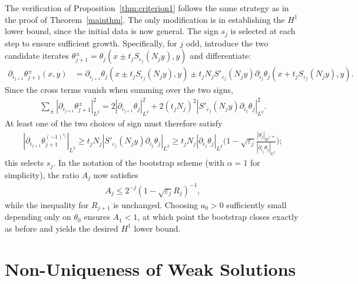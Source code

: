 \documentclass[12pt]{report}   %
\renewcommand{\le}{\leqslant}
\renewcommand{\ge}{\geqslant}
\numberwithin{equation}{section}
\theoremstyle{plain}
\theoremstyle{definition}
\theoremstyle{remark}
\newcommand{\eps}{{\varepsilon}}
\newcommand{\rd}{\partial}
\begin{document}
The verification of Proposition~\ref{thm:criterion1} follows the same strategy as in the proof of Theorem~\ref{mainthm}. The only modification is in establishing the $H^1$ lower bound, since the initial data is now general. The sign $s_j$ is selected at each step to ensure sufficient growth. Specifically, for $j$ odd, introduce the two candidate iterates $\theta_{j+1}^{\pm} = \theta_j (x \pm t_j S_{\eps_j}(N_jy),y)$ and differentiate:
\begin{equation*}
\begin{split}
\rd_{i_{j+1}} \theta_{j+1}^{\pm}(x,y) &= \rd_{i_{j+1}}\theta_j(x \pm t_j S_{\eps_j}(N_jy),y ) \pm t_jN_j S'_{\eps_j}(N_jy) \rd_{i_j}\theta_j(x + t_j S_{\eps_j}(N_jy),y ).
\end{split}
\end{equation*}
Since the cross terms vanish when summing over the two signs,
\begin{equation*}
\begin{split}
\sum_{\pm}|\rd_{i_{j+1}} \theta_{j+1}^{\pm} |_{L^2}^2 = 2|\rd_{i_{j+1}}\theta_j|_{L^2}^2 + 2(t_jN_j)^2 |S'_{\eps_j}(N_jy) \rd_{i_j}\theta_j|_{L^2}^2.
\end{split}
\end{equation*}
At least one of the two choices of sign must therefore satisfy
\begin{equation*}
\begin{split}
|\rd_{i_{j+1}} \theta_{j+1}^{(-1)^{s_j}} |_{L^2} \ge t_jN_j|S'_{\eps_j}(N_jy) \rd_{i_j}\theta_j|_{L^2} \ge t_jN_j |\rd_{i_j} \theta_j|_{L^2} \Big(1 - \sqrt{\eps_j} \frac{|\theta_j|_{\dot{W}^{1,\infty}}}{|\rd_{i_j}\theta_j|_{L^2}} \Big);
\end{split}
\end{equation*}
this selects $s_j$. In the notation of the bootstrap scheme (with $\alpha = 1$ for simplicity), the ratio $A_j$ now satisfies
\begin{equation*}
\begin{split}
A_j \le 2^{-j} (1 - \sqrt{\eps_j}R_j)^{-1},
\end{split}
\end{equation*}
while the inequality for $R_{j+1}$ is unchanged. Choosing $a_0 > 0$ sufficiently small depending only on $\theta_0$ ensures $A_1 < 1$, at which point the bootstrap closes exactly as before and yields the desired $H^1$ lower bound.
\strut\hfill\qedsymbol





\section{Non-Uniqueness of Weak Solutions }\label{s:nonuniq}
\end{document}
